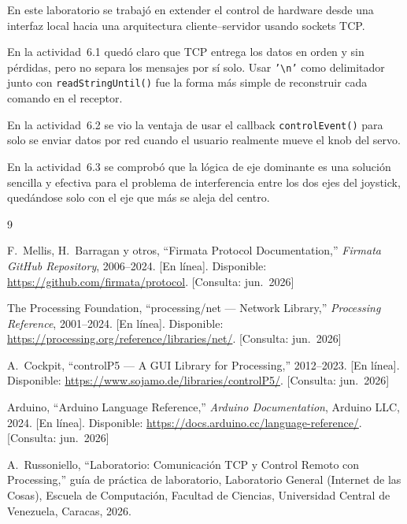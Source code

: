 En este laboratorio se trabajó en extender el control de hardware desde una interfaz local
hacia una arquitectura cliente--servidor usando sockets TCP.

En la actividad~6.1 quedó claro que TCP entrega los datos en orden y sin pérdidas, pero no
separa los mensajes por sí solo. Usar \texttt{'\textbackslash n'} como delimitador junto con
\texttt{readStringUntil()} fue la forma más simple de reconstruir cada comando en el receptor.

En la actividad~6.2 se vio la ventaja de usar el callback \texttt{controlEvent()} para 
solo se enviar datos por red cuando el usuario realmente mueve el knob del servo. 

En la actividad~6.3 se comprobó que la lógica de eje dominante es una solución sencilla y
efectiva para el problema de interferencia entre los dos ejes del joystick, quedándose solo
con el eje que más se aleja del centro.

\clearpage
\begingroup
\small
\begin{thebibliography}{9}

F.~Mellis, H.~Barragan y otros, ``Firmata Protocol Documentation,''
\emph{Firmata GitHub Repository}, 2006--2024.
[En l\'{i}nea]. Disponible: \url{https://github.com/firmata/protocol}.
[Consulta: jun.~2026]

The Processing Foundation, ``processing/net --- Network Library,''
\emph{Processing Reference}, 2001--2024.
[En l\'{i}nea]. Disponible: \url{https://processing.org/reference/libraries/net/}.
[Consulta: jun.~2026]

A.~Cockpit, ``controlP5 --- A GUI Library for Processing,'' 2012--2023.
[En l\'{i}nea]. Disponible: \url{https://www.sojamo.de/libraries/controlP5/}.
[Consulta: jun.~2026]

Arduino, ``Arduino Language Reference,'' \emph{Arduino Documentation},
Arduino LLC, 2024. [En l\'{i}nea]. Disponible:
\url{https://docs.arduino.cc/language-reference/}. [Consulta: jun.~2026]

A.~Russoniello, ``Laboratorio: Comunicaci\'{o}n TCP y Control Remoto con Processing,''
gu\'{i}a de pr\'{a}ctica de laboratorio, Laboratorio General (Internet de las Cosas),
Escuela de Computaci\'{o}n, Facultad de Ciencias,
Universidad Central de Venezuela, Caracas, 2026.

\end{thebibliography}
\endgroup

